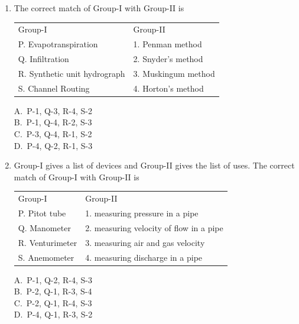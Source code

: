 \documentclass[journal,12pt,onecolumn]{exam}
\theoremstyle{remark}
\begin{document}
\begin{enumerate}
\noindent\item The correct match of Group-I with Group-II is
\hfill{}
\begin{table}[H]
\centering
\begin{tabular}{l l}
Group-I & Group-II \\
P. Evapotranspiration     & 1. Penman method \\
Q. Infiltration    & 2. Snyder’s method \\
R. Synthetic unit hydrograph    & 3. Muskingum method  \\
S. Channel Routing    & 4. Horton's method
\end{tabular}
\label{table1}
\end{table}

\begin{multicols}{4}
A.\ P-1, Q-3, R-4, S-2 \\
B.\ P-1, Q-4, R-2, S-3 \\
C.\ P-3, Q-4, R-1, S-2 \\
D.\ P-4, Q-2, R-1, S-3
\end{multicols}

\noindent\item Group-I gives a list of devices and Group-II gives the list of uses. The correct match of Group-I with Group-II is
\hfill{}

\begin{table}[H]
    \centering
\begin{tabular}{l l}
Group-I  & Group-II  \\
P. Pitot tube & 1. measuring pressure in a pipe \\
Q. Manometer   & 2. measuring velocity of flow in a pipe     \\
R. Venturimeter     & 3. measuring air and gas velocity          \\
S. Anemometer    & 4. measuring discharge in a pipe
\end{tabular}
\label{table2}
\end{table}

\begin{multicols}{4}
A.\ P-1, Q-2, R-4, S-3 \\
B.\ P-2, Q-1, R-3, S-4 \\
C.\ P-2, Q-1, R-4, S-3 \\
D.\ P-4, Q-1, R-3, S-2
\end{multicols}


\end{enumerate}
\end{document}
